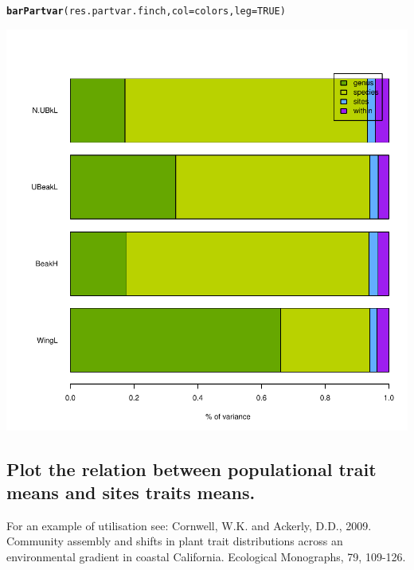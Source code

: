 \documentclass[12pt]{article}\usepackage[]{graphicx}\usepackage[]{color}
\makeatletter
\def\maxwidth{ %
  \ifdim\Gin@nat@width>\linewidth
    \linewidth
  \else
    \Gin@nat@width
  \fi
}
\newcommand{\hlnum}[1]{\textcolor[rgb]{0.686,0.059,0.569}{#1}}%
\newcommand{\hlstd}[1]{\textcolor[rgb]{0.345,0.345,0.345}{#1}}%
\newcommand{\hlkwc}[1]{\textcolor[rgb]{0.333,0.667,0.333}{#1}}%
\newcommand{\hlkwd}[1]{\textcolor[rgb]{0.737,0.353,0.396}{\textbf{#1}}}%
\newenvironment{kframe}{%
 \def\at@end@of@kframe{}%
 \ifinner\ifhmode%
  \def\at@end@of@kframe{\end{minipage}}%
  \begin{minipage}{\columnwidth}%
 \fi\fi%
 \def\FrameCommand##1{\hskip\@totalleftmargin \hskip-\fboxsep
 \colorbox{shadecolor}{##1}\hskip-\fboxsep
     \hskip-\linewidth \hskip-\@totalleftmargin \hskip\columnwidth}%
 \MakeFramed {\advance\hsize-\width
   \@totalleftmargin\z@ \linewidth\hsize
   \@setminipage}}%
 {\par\unskip\endMakeFramed%
 \at@end@of@kframe}
\newenvironment{knitrout}{}{} %
\makeatother
\begin{document}
\begin{knitrout}
\color{fgcolor}\begin{kframe}
\begin{alltt}
\hlkwd{barPartvar}\hlstd{(res.partvar.finch,} \hlkwc{col} \hlstd{= colors,} \hlkwc{leg} \hlstd{=} \hlnum{TRUE}\hlstd{)}
\end{alltt}
\end{kframe}

{\centering \includegraphics[width=\maxwidth]{figure/unnamed-chunk-26} 

}



\end{knitrout}


\newpage

\subsection{Plot the relation between populational trait means and sites traits means.}

For an example of utilisation see: Cornwell, W.K. and Ackerly, D.D., 2009. Community assembly and shifts in plant trait distributions across an environmental gradient in coastal California. Ecological Monographs, 79, 109-126.
\end{document}
